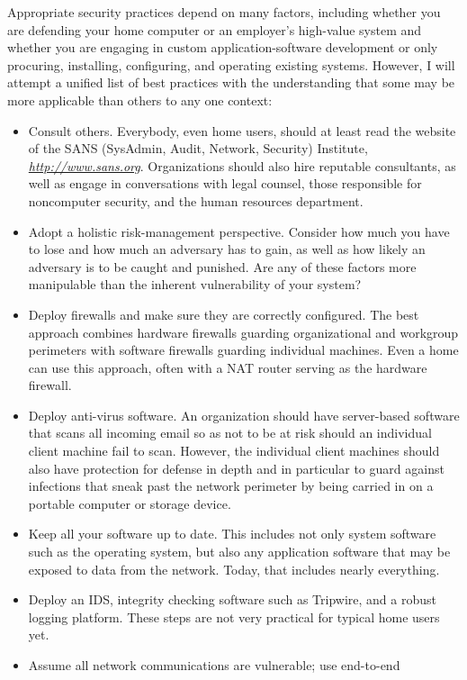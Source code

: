 Appropriate security practices depend on many factors, including
whether you are defending your home computer or an employer's
high-value system and whether you are engaging in custom
application-software development or only procuring, installing,
configuring, and operating existing systems.  However, I will attempt
a unified list of best practices with the understanding that some may
be more applicable than others to any one context:
\begin{itemize}
\item
Consult others.  Everybody, even home users, should at least read 
the website of the SANS (SysAdmin, Audit, Network,
Security) Institute, \textit{\url{http://www.sans.org}}.  Organizations should also hire reputable
consultants, as well as engage in conversations with legal counsel,
those responsible for noncomputer security, and the human resources
department.
\item
Adopt a holistic risk-management perspective.  Consider how much you
have to lose and how much an adversary has to gain, as well as how
likely an adversary is to be caught and punished.  Are any of these
factors more manipulable than the inherent vulnerability of your
system?
\item
Deploy firewalls and make sure they are correctly configured.  The
best approach combines hardware firewalls guarding organizational and
workgroup perimeters with software firewalls guarding individual
machines.  Even a home can use this approach, often with a NAT router
serving as the hardware firewall.
\item
Deploy anti-virus software.  An organization should have server-based
software that scans all incoming email so as not to be at risk should
an individual client machine fail to scan.  However, the individual
client machines should also have protection for defense in depth and
in particular to guard against infections that sneak past the network
perimeter by being carried in on a portable computer or storage
device.
\item
Keep all your software up to date.  This includes not
only system software such as the operating system, but also any
application software that may be exposed to data from the network.
Today, that includes nearly everything.
\item
Deploy an IDS, integrity checking software such as Tripwire, and a
robust logging platform.  These steps are not very practical for
typical home users yet.
\item
Assume all network communications are vulnerable; use end-to-end

\end{itemize}
